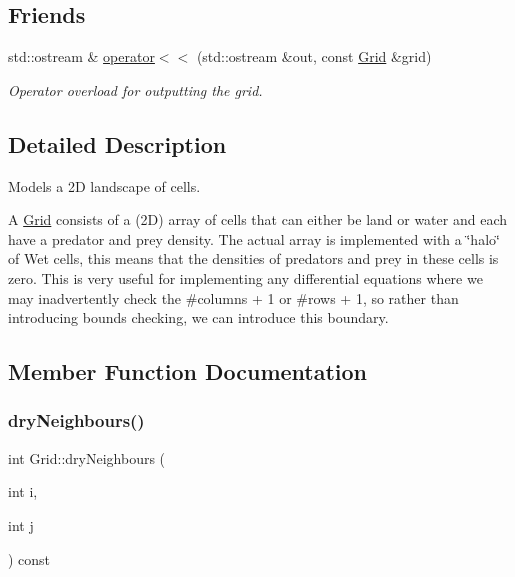 \subsection*{Friends}
\begin{DoxyCompactItemize}
\item 
std\+::ostream \& \hyperlink{class_grid_a3513576c9cced69b185e4be8fe248e8c}{operator$<$$<$} (std\+::ostream \&out, const \hyperlink{class_grid}{Grid} \&grid)
\begin{DoxyCompactList}\small\item\em Operator overload for outputting the grid. \end{DoxyCompactList}\end{DoxyCompactItemize}


\subsection{Detailed Description}
Models a 2D landscape of cells. 

A \hyperlink{class_grid}{Grid} consists of a (2D) array of cells that can either be land or water and each have a predator and prey density. The actual array is implemented with a \char`\"{}halo\char`\"{} of Wet cells, this means that the densities of predators and prey in these cells is zero. This is very useful for implementing any differential equations where we may inadvertently check the \#columns + 1 or \#rows + 1, so rather than introducing bounds checking, we can introduce this boundary. 

\subsection{Member Function Documentation}
\mbox{\label{class_grid_a50f4c0db20b466c84a1d65004e51642e}} 
\subsubsection{\texorpdfstring{dry\+Neighbours()}{dryNeighbours()}}
{\footnotesize\ttfamily int Grid\+::dry\+Neighbours (\begin{DoxyParamCaption}\item[{int}]{i,  }\item[{int}]{j }\end{DoxyParamCaption}) const}



